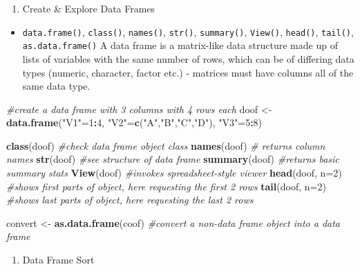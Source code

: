 \documentclass[]{book}
\newenvironment{Shaded}{\begin{snugshade}}{\end{snugshade}}
\newcommand{\CommentTok}[1]{\textcolor[rgb]{0.56,0.35,0.01}{\textit{#1}}}
\newcommand{\DataTypeTok}[1]{\textcolor[rgb]{0.13,0.29,0.53}{#1}}
\newcommand{\DecValTok}[1]{\textcolor[rgb]{0.00,0.00,0.81}{#1}}
\newcommand{\KeywordTok}[1]{\textcolor[rgb]{0.13,0.29,0.53}{\textbf{#1}}}
\newcommand{\NormalTok}[1]{#1}
\newcommand{\OperatorTok}[1]{\textcolor[rgb]{0.81,0.36,0.00}{\textbf{#1}}}
\newcommand{\StringTok}[1]{\textcolor[rgb]{0.31,0.60,0.02}{#1}}
\providecommand{\tightlist}{%
  \setlength{\itemsep}{0pt}\setlength{\parskip}{0pt}}
\begin{document}
\begin{enumerate}
\def\labelenumi{\arabic{enumi}.}
\setcounter{enumi}{11}
\tightlist
\item
  Create \& Explore Data Frames
\end{enumerate}

\begin{itemize}
\tightlist
\item
  \texttt{data.frame()}, \texttt{class()}, \texttt{names()}, \texttt{str()}, \texttt{summary()}, \texttt{View()}, \texttt{head()}, \texttt{tail()}, \texttt{as.data.frame()}
  A data frame is a matrix-like data structure made up of lists of variables with the same number of rows, which can be of differing data types (numeric, character, factor etc.) - matrices must have columns all of the same data type.
\end{itemize}

\begin{Shaded}
\begin{Highlighting}[]
\CommentTok{#create a data frame with 3 columns with 4 rows each}
\NormalTok{doof <-}\StringTok{ }\KeywordTok{data.frame}\NormalTok{(}\StringTok{"V1"}\NormalTok{=}\DecValTok{1}\OperatorTok{:}\DecValTok{4}\NormalTok{, }\StringTok{"V2"}\NormalTok{=}\KeywordTok{c}\NormalTok{(}\StringTok{"A"}\NormalTok{,}\StringTok{"B"}\NormalTok{,}\StringTok{"C"}\NormalTok{,}\StringTok{"D"}\NormalTok{), }\StringTok{"V3"}\NormalTok{=}\DecValTok{5}\OperatorTok{:}\DecValTok{8}\NormalTok{)}

\KeywordTok{class}\NormalTok{(doof) }\CommentTok{#check data frame object class}
\KeywordTok{names}\NormalTok{(doof) }\CommentTok{# returns column names}
\KeywordTok{str}\NormalTok{(doof) }\CommentTok{#see structure of data frame}
\KeywordTok{summary}\NormalTok{(doof) }\CommentTok{#returns basic summary stats}
\KeywordTok{View}\NormalTok{(doof) }\CommentTok{#invokes spreadsheet-style viewer}
\KeywordTok{head}\NormalTok{(doof, }\DataTypeTok{n=}\DecValTok{2}\NormalTok{) }\CommentTok{#shows first parts of object, here requesting the first 2 rows}
\KeywordTok{tail}\NormalTok{(doof, }\DataTypeTok{n=}\DecValTok{2}\NormalTok{) }\CommentTok{#shows last parts of object, here requesting the last 2 rows}

\NormalTok{convert <-}\StringTok{ }\KeywordTok{as.data.frame}\NormalTok{(coof) }\CommentTok{#convert a non-data frame object into a data frame}
\end{Highlighting}
\end{Shaded}

\begin{enumerate}
\def\labelenumi{\arabic{enumi}.}
\setcounter{enumi}{12}
\tightlist
\item
  Data Frame Sort
\end{enumerate}
\end{document}
